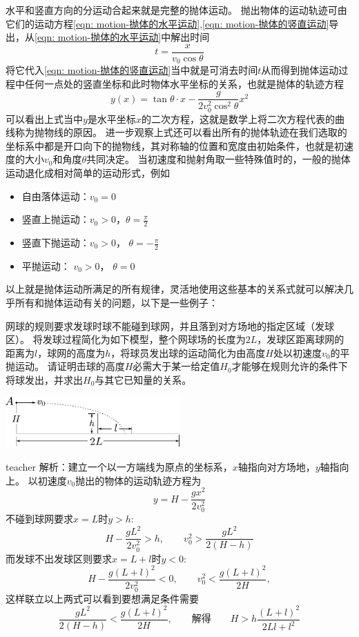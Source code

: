 水平和竖直方向的分运动合起来就是完整的抛体运动。
抛出物体的运动轨迹可由它们的运动方程\ref{eqn: motion-抛体的水平运动},\ref{eqn: motion-抛体的竖直运动}导出，从\ref{eqn: motion-抛体的水平运动}中解出时间
\[
t = \frac{x}{v_0\cos\theta}
\]
将它代入\ref{eqn: motion-抛体的竖直运动}当中就是可消去时间$t$从而得到抛体运动过程中任何一点处的竖直坐标和此时物体水平坐标的关系，也就是抛体的{\heiti 轨迹方程}
\begin{equation}\label{eqn: motion-抛体的轨迹方程}
y(x) = \tan\theta\cdot x-\frac{g}{2v_0^2\cos^2\theta}x^2
\end{equation}
可以看出上式当中$y$是水平坐标$x$的二次方程，这就是数学上将二次方程代表的曲线称为抛物线的原因。
进一步观察上式还可以看出所有的抛体轨迹在我们选取的坐标系中都是开口向下的抛物线，其对称轴的位置和宽度由初始条件，也就是初速度的大小$v_0$和角度$\theta$共同决定。
当初速度和抛射角取一些特殊值时的，一般的抛体运动退化成相对简单的运动形式，例如
\begin{itemize}
\item
自由落体运动：$v_0 = 0$
\item
竖直上抛运动：$v_0>0$，$\theta =  \frac{ \pi}{2}$
\item
竖直下抛运动：$v_0>0$， $ \theta = - \frac{ \pi}{2}$
\item
平抛运动： $v_0>0$， $ \theta=0$
\end{itemize}
以上就是抛体运动所满足的所有规律，灵活地使用这些基本的关系式就可以解决几乎所有和抛体运动有关的问题，以下是一些例子：

\begin{example}
网球的规则要求发球时球不能碰到球网，并且落到对方场地的指定区域（发球区）。
将发球过程简化为如下模型，整个网球场的长度为$2L$，发球区距离球网的距离为$l$，球网的高度为$h$，将球员发出球的运动简化为由高度$H$处以初速度$v_0$的平抛运动。
请证明击球的高度$H$必需大于某一给定值$H_0$才能够在规则允许的条件下将球发出，并求出$H_0$与其它已知量的关系。
\begin{flushright}
\includegraphics[width = 0.5\textwidth]{images/motion-8.pdf}
\end{flushright}
\begin{taggedblock}{teacher}
\noindent
解析：建立一个以一方端线为原点的坐标系，$x$轴指向对方场地，$y$轴指向上。
以初速度$v_0$抛出的物体的运动轨迹方程为
\[
y = H -\frac{gx^2}{2v_0^2}
\]
不碰到球网要求$x=L$时$y>h$:
\[
H-\frac{gL^2}{2v_0^2}>h,\qquad v_0^2>\frac{gL^2}{2(H-h)}
\]
而发球不出发球区则要求$x=L+l$时$y<0$:
\[
H-\frac{g(L+l)^2}{2v_0^2}<0,\qquad v_0^2<\frac{g(L+l)^2}{2H},
\]
这样联立以上两式可以看到要想满足条件需要
\[
\frac{gL^2}{2(H-h)}<\frac{g(L+l)^2}{2H},\qquad\textbf{解得}\qquad H>h\frac{(L+l)^2}{2Ll+l^2}
\]
\end{taggedblock}
\end{example}

